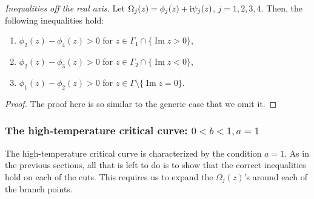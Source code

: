 \documentclass[10pt,a4paper]{amsart}
\numberwithin{equation}{section}
\begin{document}
\begin{prop}
 \textit{Inequalities off the real axis.}
 Let $\Omega_j(z) = \phi_j(z) + {\rm i}\psi_j(z)$, $j = 1,2,3,4$. Then, the following inequalities hold:
 \begin{enumerate}\itemsep=0pt
 \item $\phi_2(z) - \phi_4(z) > 0$ for $z \in \Gamma_1 \cap \{\operatorname{Im} z > 0\}$,
 \item $\phi_2(z) - \phi_3(z) > 0$ for $z \in \Gamma_2 \cap \{\operatorname{Im} z < 0\}$,
 \item $\phi_1(z) - \phi_2(z) > 0$ for $z \in \Gamma \setminus \{\operatorname{Im} z = 0\}$.
 \end{enumerate}
\end{prop}
\begin{proof}
 The proof here is so similar to the generic case that we omit it.
\end{proof}

\subsubsection{The high-temperature critical curve: $0< b < 1, a = 1$}
The high-temperature critical curve is characterized by the condition $a=1$. As in the previous sections, all that is left to do is to show that the correct inequalities hold on each of the cuts. This requires us to expand the $\Omega_j(z)$'s around each of the branch points.
\end{document}
